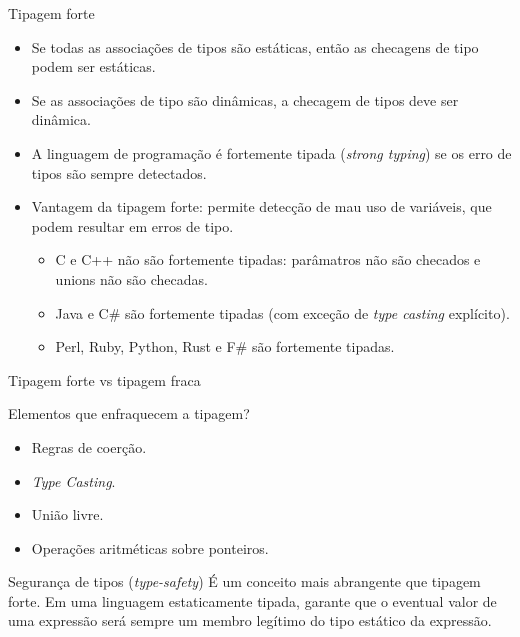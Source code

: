 \documentclass[handout]{beamer}
\begin{document}
\begin{frame}{Tipagem forte}

\begin{itemize}
\item Se todas as associações de tipos são estáticas, então as checagens de tipo podem ser estáticas.

\item Se as associações de tipo são dinâmicas, a checagem de tipos deve ser dinâmica.

\item A linguagem de programação é fortemente tipada (\textit{strong typing}) se os erro de tipos são sempre detectados.

\item Vantagem da tipagem forte: permite detecção de mau uso de variáveis, que podem resultar em erros de tipo.

\begin{itemize}
\item C e C++ não são fortemente tipadas: parâmatros não são checados e unions não são checadas.

\item Java e C\# são fortemente tipadas (com exceção de \textit{type casting} explícito).

\item Perl, Ruby, Python, Rust e F\# são fortemente tipadas.
\end{itemize}
\end{itemize}
\end{frame}


\begin{frame}[fragile]{Tipagem forte vs tipagem fraca}

Elementos que enfraquecem a tipagem?
\begin{itemize}
    \item Regras de coerção.
    \item \textit{Type Casting}.
    \item União livre.
    \item Operações aritméticas sobre ponteiros.
\end{itemize}

\begin{block}{Segurança de tipos (\textit{type-safety})}
    É um conceito mais abrangente que tipagem forte. Em uma linguagem estaticamente tipada, garante que o eventual valor de uma expressão será sempre um membro legítimo do tipo estático da expressão.
\end{block}
\end{frame}
\end{document}
